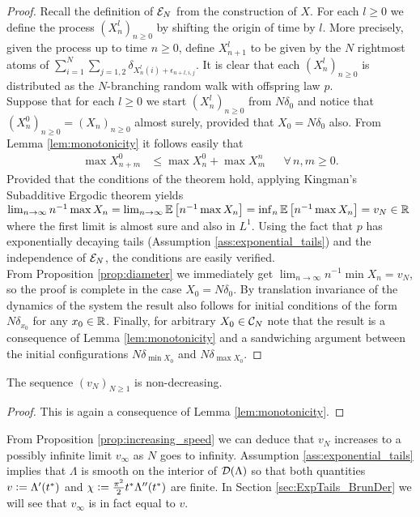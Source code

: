 \begin{proof}
Recall the definition of $\cal{E}_N$ from the construction of $X$. For each $l \geq 0$ we define the process $(X^l_n)_{n \geq 0}$ by shifting the origin of time by $l$. More precisely, given the process up to time $n \geq 0$, define $X^l_{n+1}$ to be given by the $N$ rightmost atoms of $\sum_{i = 1}^N \sum_{j=1,2} \delta_{X^l_n(i) + \epsilon_{n + l, i, j}}$. It is clear that each $(X^l_n)_{n \geq 0}$ is distributed as the $N$-branching random walk with offspring law $p$. \\
Suppose that for each $l \geq 0$ we start $(X^l_n)_{n \geq 0}$ from $N \delta_0$ and notice that $(X^0_n)_{n \geq 0} = (X_n)_{n \geq 0}$ almost surely, provided that $X_0 = N \delta_0$ also. From Lemma \ref{lem:monotonicity} it follows easily that 
\begin{align}
\max X^0_{n + m} &\leq \max X^0_n + \max X^n_m && \forall\, n,m \geq 0. 
\end{align}
Provided that the conditions of the theorem hold, applying Kingman's Subadditive Ergodic theorem yields $\lim_{n \to \infty} n^{-1} \max X_n = \lim_{n \to \infty} \Ex{n^{-1} \max X_n} = \inf_n \Ex{n^{-1} \max X_n} = v_N \in \R$ where the first limit is almost sure and also in $L^1$. Using the fact that $p$ has exponentially decaying tails (Assumption \ref{ass:exponential_tails}) and the independence of $\cal{E}_N$, the conditions are easily verified. \\
From Proposition \ref{prop:diameter} we immediately get $\lim_{n \to \infty} n^{-1} \min X_n = v_N$, so the proof is complete in the case $X_0 = N \delta_0$. By translation invariance of the dynamics of the system the result also follows for initial conditions of the form $N \delta_{x_0}$ for any $x_0 \in \R$. Finally, for arbitrary $X_0 \in \cal{C}_N$ note that the result is a consequence of Lemma \ref{lem:monotonicity} and a sandwiching argument between the initial configurations $N \delta_{\min X_0}$ and $N \delta_{\max X_0}$. 
\end{proof}

\begin{proposition}\label{prop:increasing_speed}
The sequence $(v_N)_{N \geq 1}$ is non-decreasing. 
\end{proposition}
\begin{proof}
This is again a consequence of Lemma \ref{lem:monotonicity}. 
\end{proof}

\begin{remark}\label{rem:constants}
From Proposition \ref{prop:increasing_speed} we can deduce that $v_N$ increases to a possibly infinite limit $v_\infty$ as $N$ goes to infinity. Assumption \ref{ass:exponential_tails} implies that $\Lambda$ is smooth on the interior of $\cal{D}(\Lambda)$ so that both quantities $v \defeq \Lambda'(t^*)$ and $\chi \defeq \frac{\pi^2}{2} t^* \Lambda''(t^*)$ are finite. In Section \ref{sec:ExpTails_BrunDer} we will see that $v_\infty$ is in fact equal to $v$. 
\end{remark}

